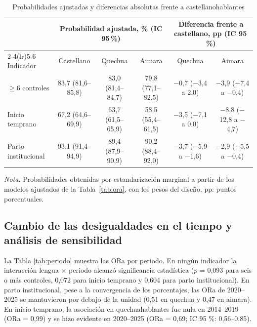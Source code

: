 \documentclass[
  spanish,
  letterpaper,
  conference]{IEEEtran}
\newcommand{\notatabla}[1]{\par\vspace{2pt}\parbox{\linewidth}{\footnotesize\emph{Nota.} #1}}
\begin{document}
\begin{table}[!t]
\centering
\caption{Probabilidades ajustadas y diferencias absolutas frente a castellanohablantes}
\label{tab:abs}
\small
\setlength{\tabcolsep}{5pt}
\begin{tabular}{lccccc}
\toprule
& \multicolumn{3}{c}{Probabilidad ajustada, \% (IC 95\,\%)} & \multicolumn{2}{c}{Diferencia frente a castellano, pp (IC 95\,\%)} \\
\cmidrule(lr){2-4}\cmidrule(lr){5-6}
Indicador & Castellano & Quechua & Aimara & Quechua & Aimara \\
\midrule
$\geq$6 controles & 83,7 (81,6--85,8) & 83,0 (81,4--84,7) & 79,8 (77,1--82,5) & $-$0,7 ($-$3,4 a 2,0) & $-$3,9 ($-$7,4 a $-$0,4) \\
Inicio temprano & 67,2 (64,6--69,9) & 63,7 (61,5--65,9) & 58,5 (55,4--61,5) & $-$3,5 ($-$7,1 a 0,0) & $-$8,8 ($-$12,8 a $-$4,7) \\
Parto institucional & 93,1 (91,4--94,9) & 89,4 (87,9--90,9) & 90,2 (88,4--92,0) & $-$3,7 ($-$5,9 a $-$1,6) & $-$2,9 ($-$5,5 a $-$0,4) \\
\bottomrule
\end{tabular}
\notatabla{Probabilidades obtenidas por estandarización marginal a partir de los modelos ajustados de la Tabla~\ref{tab:ora}, con los pesos del diseño. pp: puntos porcentuales.}
\end{table}

\subsection{Cambio de las desigualdades en el tiempo y análisis de
sensibilidad}\label{cambio-de-las-desigualdades-en-el-tiempo-y-anuxe1lisis-de-sensibilidad}

La Tabla \ref{tab:periodo} muestra las ORa por periodo. En ningún
indicador la interacción lengua \(\times\) periodo alcanzó significancia
estadística (\(p\) = 0,093 para seis o más controles, 0,072 para inicio
temprano y 0,604 para parto institucional). En parto institucional, pese
a la convergencia de los porcentajes, las ORa de 2020--2025 se
mantuvieron por debajo de la unidad (0,51 en quechua y 0,47 en aimara).
En inicio temprano, la asociación en quechuahablantes fue nula en
2014--2019 (ORa = 0,99) y se hizo evidente en 2020--2025 (ORa = 0,69; IC
95 \%: 0,56--0,85).
\end{document}

